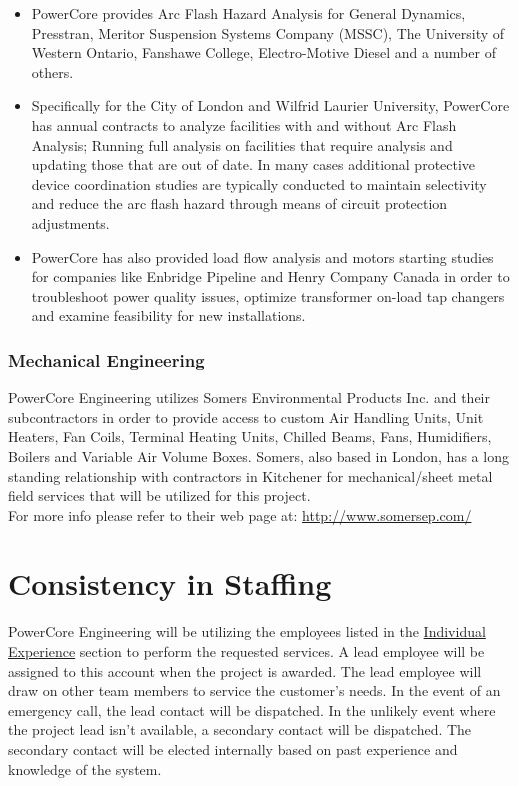 \begin{itemize}
	\item PowerCore provides Arc Flash Hazard Analysis for General Dynamics, Presstran, Meritor Suspension Systems Company (MSSC), The University of Western Ontario, Fanshawe College, Electro-Motive Diesel and a number of others. 
	\item Specifically for the City of London and Wilfrid Laurier University, PowerCore has annual contracts to analyze facilities with and without Arc Flash Analysis; Running full analysis on facilities that require analysis and updating those that are out of date. In many cases additional protective device coordination studies are typically conducted to maintain selectivity and reduce the arc flash hazard through means of circuit protection adjustments. 
	\item PowerCore has also provided load flow analysis and motors starting studies for companies like Enbridge Pipeline and Henry Company Canada in order to troubleshoot power quality issues, optimize transformer on-load tap changers and examine feasibility for new installations.
\end{itemize}

\pagebreak

\subsubsection{Mechanical Engineering}
\label{ETQ:PCEExp:Mech}
PowerCore Engineering utilizes Somers Environmental Products Inc. and their subcontractors in order to provide access to custom Air Handling Units, Unit Heaters, Fan Coils, Terminal Heating Units, Chilled Beams, Fans, Humidifiers, Boilers and Variable Air Volume Boxes. Somers, also based in London, has a long standing relationship with contractors in Kitchener for mechanical/sheet metal field services that will be utilized for this project.\\

\noindent For more info please refer to their web page at: \url{http://www.somersep.com/}\\

\pagebreak

\section{Consistency in Staffing}
\label{CS}

PowerCore Engineering will be utilizing the employees listed in the \hyperref[ETQ:IndExp]{Individual Experience} section to perform the requested services.  A lead employee will be assigned to this account when the project is awarded. The lead employee will draw on other team members to service the customer's needs.  In the event of an emergency call, the lead contact will be dispatched.  In the unlikely event where the project lead isn't available, a secondary contact will be dispatched.  The secondary contact will be elected internally based on past experience and knowledge of the system. 


